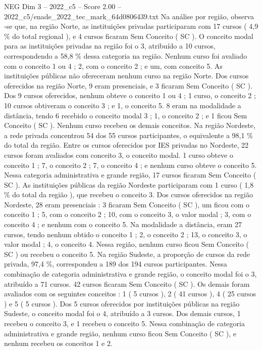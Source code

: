 \begin{textsample}{NEG Dim 3 – 2022\_c5 – Score 2.00 – 2022\_c5/enade\_2022\_tec\_mark\_64d0806439.txt}
Na análise por região, observa -se que, na região Norte, as instituições privadas participaram com 17 cursos ( 4,9 \% do total regional ), e 4 cursos ficaram Sem Conceito ( SC ).
O conceito modal para as instituições privadas na região foi o 3, atribuído a 10 cursos, correspondendo a 58,8 \% dessa categoria na região.
Nenhum curso foi avaliado com o conceito 1 ou 4 ; 2, com o conceito 2 ; e um, com conceito 5.
As instituições públicas não ofereceram nenhum curso na região Norte.
Dos cursos oferecidos na região Norte, 9 eram presenciais, e 3 ficaram Sem Conceito ( SC ).
Dos 9 cursos oferecidos, nenhum obteve o conceito 1 ou 4 ; 1 curso, o conceito 2 ; 10 cursos obtiveram o conceito 3 ; e 1, o conceito 5. 8 eram na modalidade a distância, tendo 6 recebido o conceito modal 3 ; 1, o conceito 2 ; e 1 ficou Sem Conceito ( SC ).
Nenhum curso recebeu os demais conceitos.
Na região Nordeste, a rede privada concentrou 54 dos 55 cursos participantes, o equivalente a 98,1 \% do total da região.
Entre os cursos oferecidos por IES privadas no Nordeste, 22 cursos foram avaliados com conceito 3, o conceito modal. 1 curso obteve o conceito 1 ; 7, o conceito 2 ; 7, o conceito 4 ; e nenhum curso obteve o conceito 5.
Nessa categoria administrativa e grande região, 17 cursos ficaram Sem Conceito ( SC ).
As instituições públicas da região Nordeste participaram com 1 curso ( 1,8 \% do total da região ), que recebeu o conceito 3.
Dos cursos oferecidos na região Nordeste, 28 eram presenciais : 3 ficaram Sem Conceito ( SC ), um ficou com o conceito 1 ; 5, com o conceito 2 ; 10, com o conceito 3, o valor modal ; 3, com o conceito 4 ; e nenhum com o conceito 5.
Na modalidade a distância, eram 27 cursos, tendo nenhum obtido o conceito 1 ; 2, o conceito 2 ; 13, o conceito 3, o valor modal ; 4, o conceito 4.
Nessa região, nenhum curso ficou Sem Conceito ( SC ) ou recebeu o conceito 5.
Na região Sudeste, a proporção de cursos da rede privada, 97,4 \%, correspondeu a 189 dos 194 cursos participantes.
Nessa combinação de categoria administrativa e grande região, o conceito modal foi o 3, atribuído a 71 cursos. 42 cursos ficaram Sem Conceito ( SC ).
Os demais foram avaliados com os seguintes conceitos : 1 ( 5 cursos ), 2 ( 41 cursos ), 4 ( 25 cursos ) e 5 ( 5 cursos ).
Dos 5 cursos oferecidos por instituições públicas na região Sudeste, o conceito modal foi o 4, atribuído a 3 cursos.
Dos demais cursos, 1 recebeu o conceito 3, e 1 recebeu o conceito 5.
Nessa combinação de categoria administrativa e grande região, nenhum curso ficou Sem Conceito ( SC ), e nenhum recebeu os conceitos 1 e 2.

\end{textsample}
